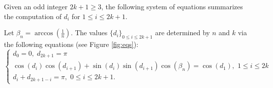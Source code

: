 \documentclass[12pt]{amsart}
\theoremstyle{plain}
\numberwithin{equation}{section}
\begin{document}
Given an odd integer $2k+1\geq 3$, the following system of equations summarizes the computation of $d_i$ for $1\leq i\leq  2k+1$.



Let $\beta_n= \arccos(\frac{1}{n})$. The values $\{d_i\}_{0\leq i\leq
  2k+1}$ are determined by $n$ and $k$ via the following equations
(see Figure \ref{fig:eqs}):
\begin{equation}\label{eqn:digon}
	\begin{cases}
		d_0 = 0, \; d_{2k+1} = \pi                                                               \\
		\cos(d_i)\cos(d_{i+1}) + \sin(d_i)\sin(d_{i+1})\cos(\beta_n) = \cos(d_1), \,\,1\leq i \leq 2k \\
		d_i + d_{2k+ 1 - i} = \pi, \,\,0\leq i \leq 2k + 1.
	\end{cases}
\end{equation}
\end{document}
